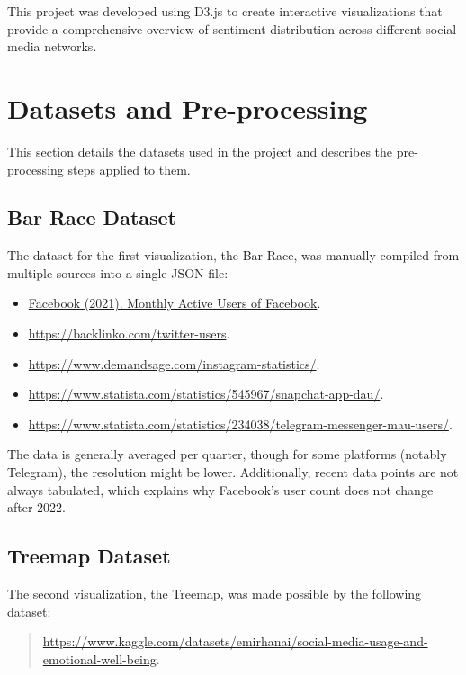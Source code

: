 \documentclass[a4paper,12pt,titlepage,leqno]{article}
\begin{document}
This project was developed using D3.js to create interactive visualizations that provide a comprehensive overview of sentiment distribution across different social media networks.

\section{Datasets and Pre-processing}

This section details the datasets used in the project and describes the pre-processing steps applied to them.

\subsection{Bar Race Dataset}
The dataset for the first visualization, the Bar Race, was manually compiled from multiple sources into a single JSON file:

\begin{itemize}
\item \href{https://doi.org/10.34740/KAGGLE/DSV/2565605}{Facebook (2021). Monthly Active Users of Facebook}.  
\item \href{Twitter (2017-2023): X (Twitter) Statistics}{https://backlinko.com/twitter-users}.
\item \href{Instagram (2013-2024): Instagram User Statistics}{https://www.demandsage.com/instagram-statistics/}.
\item \href{Snapchat (2014-2024): Snapchat Daily Active Users}{https://www.statista.com/statistics/545967/snapchat-app-dau/}.
\item \href{Telegram (2014-2024): Telegram Global MAU}{https://www.statista.com/statistics/234038/telegram-messenger-mau-users/}.
\end{itemize}

The data is generally averaged per quarter, though for some platforms (notably Telegram), the resolution might be lower. Additionally, recent data points are not always tabulated, which explains why Facebook's user count does not change after 2022.

\subsection{Treemap Dataset}
The second visualization, the Treemap, was made possible by the following dataset:

\begin{quote}
\href{Emirhan BULUT. (2024). Social Media Usage and Emotional Well-Being}{https://www.kaggle.com/datasets/emirhanai/social-media-usage-and-emotional-well-being}.
\end{quote}
\end{document}

